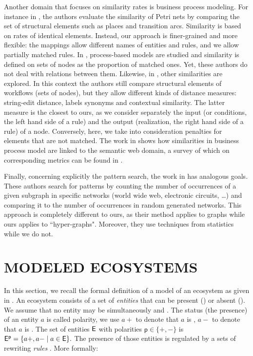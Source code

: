 \documentclass[a4paper,twoside]{article}
\begin{document}
Another domain that focuses on similarity rates is business process modeling. For instance in \cite{xiao}, the authors evaluate the similarity of Petri nets by comparing the set of structural elements such as places and transition arcs. Similarity is based on rates of identical elements. 
Instead, our approach is finer-grained and more flexible: the mappings allow different names of entities and rules, and we allow partially matched rules.  
In \cite{bae}, process-based models are studied and similarity is defined on sets of nodes as the proportion of matched ones. 
Yet, these authors do not deal with relations between them. Likewise, in \cite{DIJKMAN2011498},  other similarities are explored. In this context the authors still compare structural elements of workflows (\eg sets of nodes), but they allow different kinds of distance measures: string-edit distance, labels synonyms and contextual similarity. 
The latter measure is the closest to ours, as we consider separately the input (or conditions, the left hand side of a rule) and the output (realization, the right hand side of a rule) of a node.  
Conversely, here, we  take into consideration penalties for elements that are not matched. 
The work in \cite{DIJKMAN2011498} shows how similarities in business process model are linked to the semantic web domain, a survey of which on corresponding metrics can be found in \cite{Euzenat}.   


Finally, concerning explicitly the pattern search, the work in \cite{Milo824} has analogous goals. These authors search for patterns by counting the number of occurrences of a given subgraph in specific networks (world wide web, electronic circuits, \dots) and comparing it to the number of occurrences in random generated networks.  
This approach is completely  different to ours, as their method applies to graphs while ours applies to  ``hyper-graphs". Moreover, they use techniques from statistics while we do not.




\section{\uppercase{Modeled Ecosystems}}
\label{sec:ecosystems}
In this section, we recall the formal definition of a model of an ecosystem as given in \cite{pommereau-gaucherel2017}. 
An ecosystem consists of a set of \emph{entities} \E that can be present (\On) or absent (\Off). We assume that no entity may be simultaneously \On and \Off. The status (the presence) of an entity $a$ is called polarity, we use $a+$ to denote that $a$ is \On, $a-$ to denote that $a$ is \Off. The set of entities $\mathsf{E}$ with polarities $\mathsf{p} \in \{+,-\}$ is $\mathsf{E^p}= \{a+, a- \mid a \in \mathsf{E}\}.$ 
The presence of those entities is regulated by a sets of rewriting \emph{rules} \Ru.
More formally:
\end{document}
